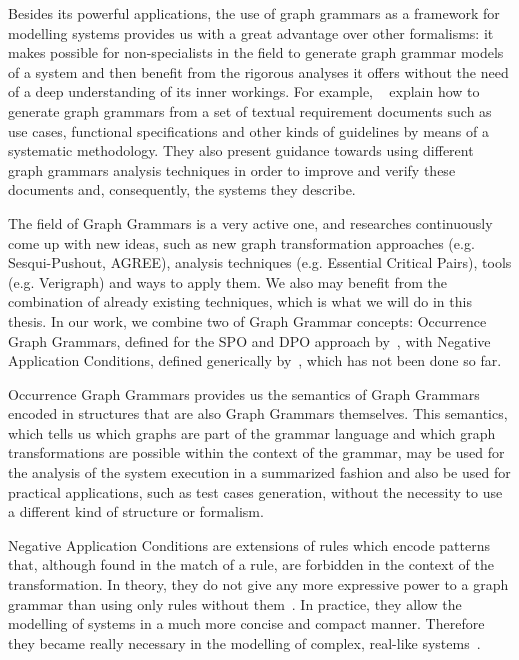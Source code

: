 Besides its powerful applications, the use of graph grammars as a framework for modelling systems provides us with a great advantage over other formalisms: it makes possible for non-specialists in the field to generate graph grammar models of a system and then benefit from the rigorous analyses it offers without the need of a deep understanding of its inner workings. For example, ~\cite{Junior2015,BezerraWEIT2016,Cota2017} explain how to generate graph grammars from a set of textual requirement documents such as use cases, functional specifications and other kinds of guidelines by means of a systematic methodology. They also present guidance towards using different graph grammars analysis techniques in order to improve and verify these documents and, consequently, the systems they describe.

The field of Graph Grammars is a very active one, and researches continuously come up with new ideas, such as new graph transformation approaches (e.g. Sesqui-Pushout, AGREE), analysis techniques (e.g. Essential Critical Pairs), tools (e.g. Verigraph) and ways to apply them. We also may benefit from the combination of already existing techniques, which is what we will do in this thesis. In our work, we combine two of Graph Grammar concepts: Occurrence Graph Grammars, defined for the SPO and DPO approach by~\cite{Ribeiro1996, Corradini1996}, with Negative Application Conditions, defined generically by~\cite{Habel1996}, which has not been done so far. 

Occurrence Graph Grammars provides us the semantics of Graph Grammars encoded in structures that are also Graph Grammars themselves. This semantics, which tells us which graphs are part of the grammar language and which graph transformations are possible within the context of the grammar, may be used for the analysis of the system execution in a summarized fashion and also be used for practical applications, such as test cases generation, without the necessity to use a different kind of structure or formalism.

Negative Application Conditions are extensions of rules which encode patterns that, although found in the match of a rule, are forbidden in the context of the transformation. In theory, they do not give any more expressive power to a graph grammar than using only rules without them~\cite{Habel1996}. In practice, they allow the modelling of systems in a much more concise and compact manner. Therefore they became really necessary in the modelling of complex, real-like systems~\cite{Corradini2013, Corradini2014}.

